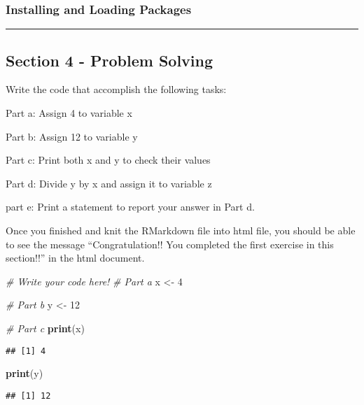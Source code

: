 \documentclass[
]{article}
\newenvironment{Shaded}{\begin{snugshade}}{\end{snugshade}}
\newcommand{\CommentTok}[1]{\textcolor[rgb]{0.56,0.35,0.01}{\textit{#1}}}
\newcommand{\DecValTok}[1]{\textcolor[rgb]{0.00,0.00,0.81}{#1}}
\newcommand{\FunctionTok}[1]{\textcolor[rgb]{0.13,0.29,0.53}{\textbf{#1}}}
\newcommand{\NormalTok}[1]{#1}
\newcommand{\OtherTok}[1]{\textcolor[rgb]{0.56,0.35,0.01}{#1}}
\begin{document}
\subsubsection{Installing and Loading
Packages}\label{installing-and-loading-packages}

\begin{center}\rule{0.5\linewidth}{0.5pt}\end{center}

\subsection{Section 4 - Problem
Solving}\label{section-4---problem-solving}

Write the code that accomplish the following tasks:

Part a: Assign 4 to variable x

Part b: Assign 12 to variable y

Part c: Print both x and y to check their values

Part d: Divide y by x and assign it to variable z

part e: Print a statement to report your answer in Part d.

Once you finished and knit the RMarkdown file into html file, you should
be able to see the message ``Congratulation!! You completed the first
exercise in this section!!'' in the html document.

\begin{Shaded}
\begin{Highlighting}[]
\CommentTok{\# Write your code here!}
\CommentTok{\# Part a}
\NormalTok{x }\OtherTok{\textless{}{-}} \DecValTok{4}

\CommentTok{\# Part b}
\NormalTok{y }\OtherTok{\textless{}{-}} \DecValTok{12}

\CommentTok{\# Part c}
\FunctionTok{print}\NormalTok{(x)}
\end{Highlighting}
\end{Shaded}

\begin{verbatim}
## [1] 4
\end{verbatim}

\begin{Shaded}
\begin{Highlighting}[]
\FunctionTok{print}\NormalTok{(y)}
\end{Highlighting}
\end{Shaded}

\begin{verbatim}
## [1] 12
\end{verbatim}
\end{document}
